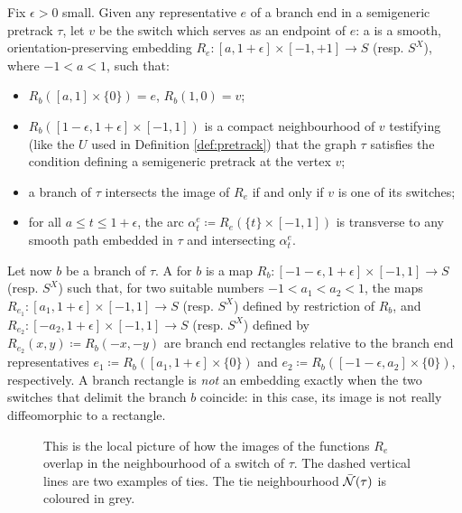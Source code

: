 \begin{defin}
Fix $\epsilon>0$ small. Given any representative $e$ of a branch end in a semigeneric pretrack $\tau$, let $v$ be the switch which serves as an endpoint of $e$: a  is a smooth, orientation-preserving embedding $R_e: [a,1+\epsilon]\times[-1,+1]\rightarrow S$ (resp. $S^X$), where $-1<a<1$, such that:
\begin{itemize}
\item $R_b([a,1]\times\{0\})=e$, $R_b(1,0)=v$;
\item $R_b([1-\epsilon,1+\epsilon]\times[-1,1])$ is a compact neighbourhood of $v$ testifying (like the $U$ used in Definition \ref{def:pretrack}) that the graph $\tau$ satisfies the condition defining a semigeneric pretrack at the vertex $v$;
\item a branch of $\tau$ intersects the image of $R_e$ if and only if $v$ is one of its switches;
\item for all $a\leq t\leq 1+\epsilon$, the arc $\alpha_t^e\coloneqq R_e(\{t\}\times[-1,1])$ is transverse to any smooth path embedded in $\tau$ and intersecting $\alpha_t^e$.
\end{itemize}

Let now $b$ be a branch of $\tau$. A  for $b$ is a map $R_b:[-1-\epsilon,1+\epsilon]\times[-1,1]\rightarrow S$ (resp. $S^X$) such that, for two suitable numbers $-1<a_1<a_2<1$, the maps $R_{e_1}:[a_1,1+\epsilon]\times[-1,1]\rightarrow S$ (resp. $S^X$) defined by restriction of $R_b$, and $R_{e_2}:[-a_2,1+\epsilon]\times[-1,1]\rightarrow S$ (resp. $S^X$) defined by $R_{e_2}(x,y)\coloneqq R_b(-x,-y)$ are branch end rectangles relative to the branch end representatives $e_1\coloneqq R_b([a_1,1+\epsilon]\times\{0\})$ and $e_2\coloneqq R_b([-1-\epsilon,a_2]\times\{0\})$, respectively. A branch rectangle is \emph{not} an embedding exactly when the two switches that delimit the branch $b$ coincide: in this case, its image is not really diffeomorphic to a rectangle.

\begin{figure}
\def\svgwidth{.65\textwidth}
\begin{center}

\end{center}
\caption{\label{fig:tienbh}This is the local picture of how the images of the functions $R_e$ overlap in the neighbourhood of a switch of $\tau$. The dashed vertical lines are two examples of ties. The tie neighbourhood $\bar{{\mathcal N}}(\tau)$ is coloured in grey.}
\end{figure}


\end{defin}
